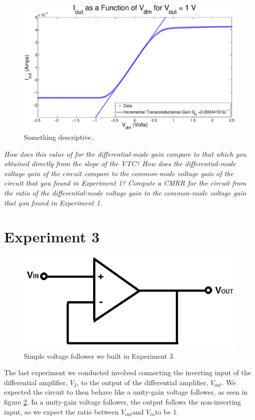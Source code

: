 \documentclass{article}
\newcommand{\Vout}{{$V_{out}$}}
\newcommand{\Vtwo}{{$V_{2}$}}
\newcommand{\Vin}{{$V_{in}$}}
\begin{document}
\begin{figure}[H]
\centering
\includegraphics[width=\linewidth]{../Figures/Exp2P3.eps}
\caption{Something descriptive..}
\label{fig:exp2p3}
\end{figure}

\textit{How does this value of for the differential-mode gain compare to that which you obtained directly from the slope of the
VTC? How does the differential-mode voltage gain of the circuit compare to the common-mode voltage gain of the circuit that you found in Experiment 1? Compute a CMRR for the circuit from the ratio of the differential-mode voltage gain to the common-mode voltage
gain that you found in Experiment 1.}


\section*{Experiment 3} 

\begin{figure}[H]
\centering
\includegraphics[width=0.5\linewidth]{../Figures/Voltage-follower}
\caption{Simple voltage follower we built in Experiment 3.}
\label{fig:voltagefollow}
\end{figure}

The last experiment we conducted involved connecting the inverting input of the differential amplifier, \Vtwo, to the output of the differential amplifier, \Vout. We expected the circuit to then behave like a unity-gain voltage follower, as seen in figure \ref{fig:voltagefollow}. In a unity-gain voltage follower, the output follows the non-inverting input, so we expect the ratio between \Vout and \Vin to be 1.
\end{document}
